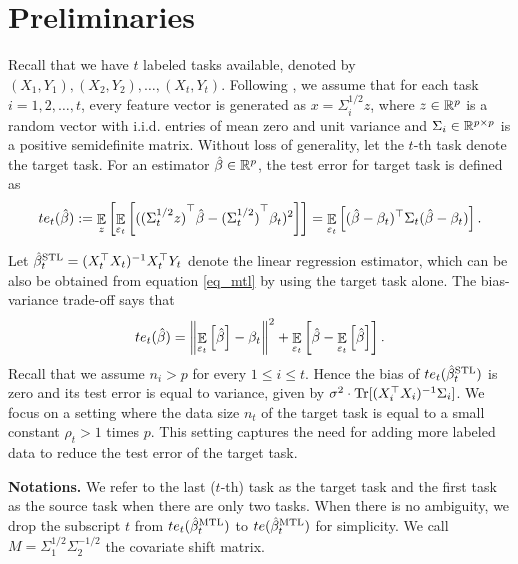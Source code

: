 \section{Preliminaries}\label{sec_setup}

Recall that we have $t$ labeled tasks available, denoted by $(X_1, Y_1), (X_2, Y_2), \dots, (X_t, Y_t)$.
Following \cite{HMRT19,BLLT20}, we assume that for each task $i = 1,2,\dots,t$,  every feature vector is generated as $x = \Sigma_i^{1/2} z$, where $z\in\mathbb{R}^p$ is a random vector with i.i.d. entries of mean zero and unit variance and $\Sigma_i\in\mathbb{R}^{p\times p}$ is a positive semidefinite matrix.
Without loss of generality, let the $t$-th task denote the target task.
For an estimator $\hat{\beta}\in\mathbb{R}^p$, the test error for target task is defined as
	\begin{align*}
		te_t(\hat{\beta}) := \mathop{\mathbb{E}}_{z}\left[ \mathop{\mathbb{E}}_{\varepsilon_t}\left[ ({(\Sigma_t^{1/2} z)}^{\top}\hat{\beta} - {(\Sigma_t^{1/2})}^{\top}\beta_t)^2 \right] \right]
		= \mathop{\mathbb{E}}_{\varepsilon_t}\left[ (\hat{\beta} - \beta_t)^{\top}\Sigma_t(\hat{\beta} - \beta_t) \right].
	\end{align*}

Let $\hat{\beta}_t^{\text{STL}} = (X_t^{\top}X_t)^{-1}X_t^{\top}Y_t$ denote the linear regression estimator, which can be also be obtained from equation \eqref{eq_mtl} by using the target task alone.
The bias-variance trade-off \cite{HTF09} says that
	\[ te_t(\hat{\beta}) =
		\left\| \mathop{\mathbb{E}}_{\varepsilon_t}\left[ \hat{\beta} \right] - \beta_t \right\|^2 + \mathop{\mathbb{E}}_{\varepsilon_t}\left[ \hat{\beta} - \mathop{\mathbb{E}}_{\varepsilon_t}\left[ \hat{\beta} \right] \right]. \]
Recall that we assume $n_i > p$ for every $1\le i\le t$.
Hence the bias of $te_t(\hat{\beta}_t^{\text{STL}})$ is zero and its test error is equal to variance, given by $\sigma^2 \cdot \operatorname{Tr}[(X_i^{\top}X_i)^{-1}\Sigma_i]$.
We focus on a setting where the data size $n_t$ of the target task is equal to a small constant $\rho_t > 1$ times $p$.
This setting captures the need for adding more labeled data to reduce the test error of the target task.



\textbf{Notations.} We refer to the last ($t$-th) task as the target task and the first task as the source task when there are only two tasks.
When there is no ambiguity, we drop the subscript $t$ from $te_t(\hat{\beta}_t^{\text{MTL}})$ to $te(\hat{\beta}_t^{\text{MTL}})$ for simplicity.
We call $M = \Sigma_1^{1/2}\Sigma_2^{-1/2}$ the covariate shift matrix.
